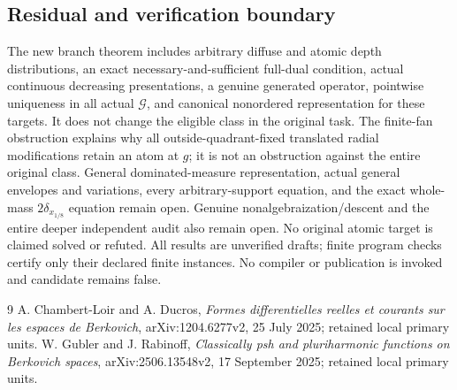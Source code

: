 \documentclass[11pt]{article}
\begin{document}
\subsection{Residual and verification boundary}
The new branch theorem includes arbitrary diffuse and atomic depth
distributions, an exact necessary-and-sufficient full-dual condition,
actual continuous decreasing presentations, a genuine generated operator,
pointwise uniqueness in all actual $\mathcal G$, and canonical nonordered
representation for these targets. It does not change the eligible class
in the original task. The finite-fan obstruction explains why all
outside-quadrant-fixed translated radial modifications retain an atom at
$g$; it is not an obstruction against the entire original class.
General dominated-measure representation, actual general envelopes and
variations, every arbitrary-support equation, and the exact whole-mass
$2\delta_{x_{1/8}}$ equation remain open. Genuine nonalgebraization/descent
and the entire deeper independent audit also remain open. No original
atomic target is claimed solved or refuted. All results are unverified
drafts; finite program checks certify only their declared finite instances.
No compiler or publication is invoked and candidate remains false.

\begin{thebibliography}{9}
 A. Chambert-Loir and A. Ducros, \emph{Formes differentielles
reelles et courants sur les espaces de Berkovich}, arXiv:1204.6277v2,
25 July 2025; retained local primary units.
 W. Gubler and J. Rabinoff, \emph{Classically psh and
pluriharmonic functions on Berkovich spaces}, arXiv:2506.13548v2,
17 September 2025; retained local primary units.
\end{thebibliography}
\end{document}
